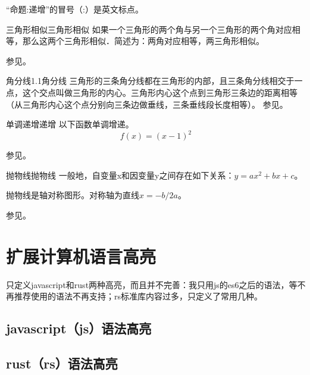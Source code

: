 \documentclass{morelull}
\begin{document}
\begin{注意}
    “命题:递增”的冒号（:）是英文标点。
\end{注意}

\begin{定理}{三角形相似}{三角形相似}
    如果一个三角形的两个角与另一个三角形的两个角对应相等，那么这两个三角形相似．简述为：两角对应相等，两三角形相似。

    参见。
\end{定理}

\begin{结论}{角分线1.1}{角分线}
    三角形的三条角分线都在三角形的内部，且三条角分线相交于一点，这个交点叫做三角形的内心。三角形内心这个点到三角形三条边的距离相等（从三角形内心这个点分别向三条边做垂线，三条垂线段长度相等）。
    参见。
\end{结论}

\begin{命题}{单调递增}{递增}
以下函数单调增递。
\[
    f(x) = (x - 1) ^ 2
\]

参见。
\end{命题}

\begin{定义}{抛物线}{抛物线}
    一般地，自变量x和因变量y之间存在如下关系：$y=ax^2+bx+c$。

    抛物线是轴对称图形。对称轴为直线$x=-b/2a$。

    参见。
\end{定义}

\section{扩展计算机语言高亮}
只定义javascript和rust两种高亮，而且并不完善：我只用js的es6之后的语法，等不再推荐使用的语法不再支持；rs标准库内容过多，只定义了常用几种。

\subsection{javascript（js）语法高亮}


\subsection{rust（rs）语法高亮}

\end{document}
